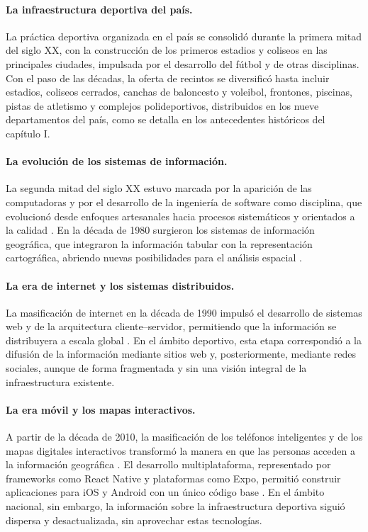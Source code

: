 \paragraph{La infraestructura deportiva del pa\'is.} La pr\'actica deportiva
organizada en el pa\'is se consolid\'o durante la primera mitad del siglo XX,
con la construcci\'on de los primeros estadios y coliseos en las principales
ciudades, impulsada por el desarrollo del f\'utbol y de otras disciplinas. Con
el paso de las d\'ecadas, la oferta de recintos se diversific\'o hasta incluir
estadios, coliseos cerrados, canchas de baloncesto y voleibol, frontones,
piscinas, pistas de atletismo y complejos polideportivos, distribuidos en los
nueve departamentos del pa\'is, como se detalla en los antecedentes hist\'oricos
del cap\'itulo I.

\paragraph{La evoluci\'on de los sistemas de informaci\'on.} La segunda mitad
del siglo XX estuvo marcada por la aparici\'on de las computadoras y por el
desarrollo de la ingenier\'ia de software como disciplina, que evolucion\'o
desde enfoques artesanales hacia procesos sistem\'aticos y orientados a la
calidad \citep{pressman2010}. En la d\'ecada de 1980 surgieron los sistemas de
informaci\'on geogr\'afica, que integraron la informaci\'on tabular con la
representaci\'on cartogr\'afica, abriendo nuevas posibilidades para el an\'alisis
espacial \citep{longley2015}.

\paragraph{La era de internet y los sistemas distribuidos.} La masificaci\'on
de internet en la d\'ecada de 1990 impuls\'o el desarrollo de sistemas web y de
la arquitectura cliente--servidor, permitiendo que la informaci\'on se
distribuyera a escala global \citep{sommerville2011}. En el \'ambito deportivo,
esta etapa correspondi\'o a la difusi\'on de la informaci\'on mediante sitios web
y, posteriormente, mediante redes sociales, aunque de forma fragmentada y sin
una visi\'on integral de la infraestructura existente.

\paragraph{La era m\'ovil y los mapas interactivos.} A partir de la d\'ecada de
2010, la masificaci\'on de los tel\'efonos inteligentes y de los mapas digitales
interactivos transform\'o la manera en que las personas acceden a la
informaci\'on geogr\'afica \citep{longley2015}. El desarrollo multiplataforma,
representado por frameworks como React Native y plataformas como Expo,
permiti\'o construir aplicaciones para iOS y Android con un \'unico c\'odigo base
\citep{reactnative, expo}. En el \'ambito nacional, sin embargo, la
informaci\'on sobre la infraestructura deportiva sigui\'o dispersa y
desactualizada, sin aprovechar estas tecnolog\'ias.

